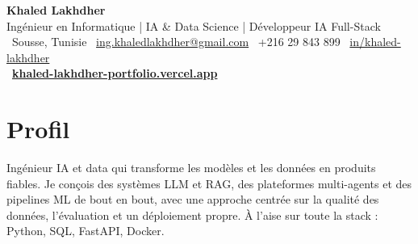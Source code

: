\documentclass[11pt,a4paper]{article}
\begin{document}
\raggedright   %

\begin{center}
  {\LARGE\bfseries\color{accent} Khaled Lakhdher}\\[3pt]
  {\large\color{muted} Ingénieur en Informatique \;|\; IA \& Data Science \;|\; Développeur IA Full-Stack}\\[5pt]
  {\small\color{muted}
    {\color{accent}\faMapMarker}~Sousse, Tunisie \quad
    {\color{accent}\faEnvelope}~\href{mailto:ing.khaledlakhdher@gmail.com}{ing.khaledlakhdher@gmail.com} \quad
    {\color{accent}\faPhone}~+216 29 843 899 \quad
    {\color{accent}\faLinkedin}~\href{https://www.linkedin.com/in/khaled-lakhdher}{in/khaled-lakhdher}
  }\\[3pt]
  {\small {\color{accent}\faGlobe}~\href{https://khaled-lakhdher-portfolio.vercel.app}{\textbf{\color{accent}khaled-lakhdher-portfolio.vercel.app}}}
\end{center}

\section{Profil}
Ingénieur IA et data qui transforme les modèles et les données en produits fiables. Je conçois des systèmes
LLM et RAG, des plateformes multi-agents et des pipelines ML de bout en bout, avec une approche centrée sur la
qualité des données, l'évaluation et un déploiement propre. À l'aise sur toute la stack : Python, SQL, FastAPI, Docker.

\end{document}
